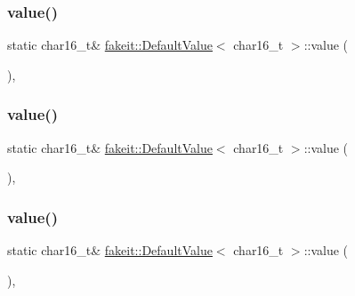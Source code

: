 \subsubsection{\texorpdfstring{value()}{value()}\hspace{0.1cm}{\footnotesize\ttfamily [1/9]}}
{\footnotesize\ttfamily static char16\+\_\+t\& \mbox{\hyperlink{structfakeit_1_1DefaultValue}{fakeit\+::\+Default\+Value}}$<$ char16\+\_\+t $>$\+::value (\begin{DoxyParamCaption}{ }\end{DoxyParamCaption})\hspace{0.3cm}{\ttfamily [inline]}, {\ttfamily [static]}}

\mbox{\label{structfakeit_1_1DefaultValue_3_01char16__t_01_4_a9d63a20d4075a4a970a51752fda22dfc}} 
\subsubsection{\texorpdfstring{value()}{value()}\hspace{0.1cm}{\footnotesize\ttfamily [2/9]}}
{\footnotesize\ttfamily static char16\+\_\+t\& \mbox{\hyperlink{structfakeit_1_1DefaultValue}{fakeit\+::\+Default\+Value}}$<$ char16\+\_\+t $>$\+::value (\begin{DoxyParamCaption}{ }\end{DoxyParamCaption})\hspace{0.3cm}{\ttfamily [inline]}, {\ttfamily [static]}}

\mbox{\label{structfakeit_1_1DefaultValue_3_01char16__t_01_4_a9d63a20d4075a4a970a51752fda22dfc}} 
\subsubsection{\texorpdfstring{value()}{value()}\hspace{0.1cm}{\footnotesize\ttfamily [3/9]}}
{\footnotesize\ttfamily static char16\+\_\+t\& \mbox{\hyperlink{structfakeit_1_1DefaultValue}{fakeit\+::\+Default\+Value}}$<$ char16\+\_\+t $>$\+::value (\begin{DoxyParamCaption}{ }\end{DoxyParamCaption})\hspace{0.3cm}{\ttfamily [inline]}, {\ttfamily [static]}}

